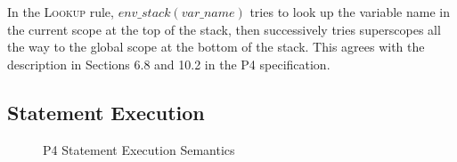 \documentclass[UTF8]{article}
\begin{document}
In the \textsc{Lookup} rule, $\mathit{env\_stack}(\mathit{var\_name})$ tries to look up the variable name in the current scope at the top of the stack, then successively tries superscopes all the way to the global scope at the bottom of the stack. This agrees with the description in Sections 6.8 and 10.2 in the P4 specification.

\newpage
\subsection{Statement Execution}

\begin{figure}[h!]
\ottdefnsstmtXXsem
\caption{P4 Statement Execution Semantics}
\label{fig:semstmtexec}
\end{figure}

%
%

\printbibliography
\end{document}
